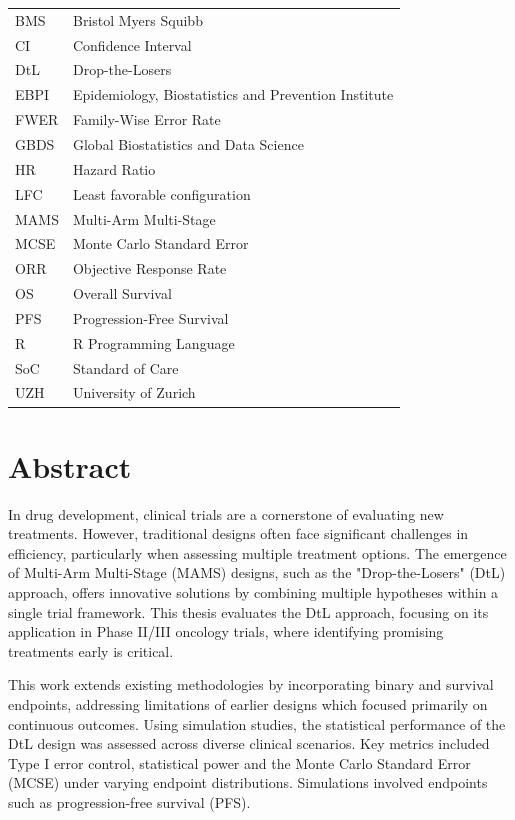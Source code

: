 \documentclass[11pt, a4paper]{article}\usepackage[]{graphicx}\usepackage[]{xcolor}
\begin{document}
\begin{tabular}{ll}
BMS                  & Bristol Myers Squibb \\
CI                   & Confidence Interval \\
DtL                  & Drop-the-Losers \\
EBPI                 & Epidemiology, Biostatistics and Prevention Institute \\
FWER                 & Family-Wise Error Rate \\
GBDS                 & Global Biostatistics and Data Science \\
HR                   & Hazard Ratio \\
LFC                  & Least favorable configuration \\
MAMS                 & Multi-Arm Multi-Stage \\
MCSE                 & Monte Carlo Standard Error \\
ORR                  & Objective Response Rate \\
OS                   & Overall Survival \\
PFS                  & Progression-Free Survival \\
R                    & R Programming Language \\
SoC                  & Standard of Care \\
UZH                  & University of Zurich \\
\end{tabular}



\newpage
\section*{Abstract} \label{sec:abstract}

In drug development, clinical trials are a cornerstone of evaluating new treatments. However, traditional designs often face significant challenges in efficiency, particularly when assessing multiple treatment options. The emergence of Multi-Arm Multi-Stage (MAMS) designs, such as the "Drop-the-Losers" (DtL) approach, offers innovative solutions by combining multiple hypotheses within a single trial framework. This thesis evaluates the DtL approach, focusing on its application in Phase II/III oncology trials, where identifying promising treatments early is critical.

This work extends existing methodologies by incorporating binary and survival endpoints, addressing limitations of earlier designs which focused primarily on continuous outcomes. Using simulation studies, the statistical performance of the DtL design was assessed across diverse clinical scenarios. Key metrics included Type I error control, statistical power and the Monte Carlo Standard Error (MCSE) under varying endpoint distributions. Simulations involved endpoints such as progression-free survival (PFS).
\end{document}
